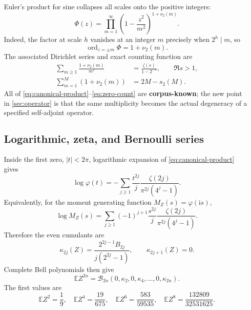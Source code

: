 \documentclass[11pt,oneside]{article}
\theoremstyle{definition}
\newcommand{\ii}{\mathrm i}
\newcommand{\E}{\mathbb E}
\newcommand{\ord}{\operatorname{ord}}
\newcommand{\vtwo}{\nu_2}
\newcommand{\wt}{s_2}
\newcommand{\PhiF}{\Phi}
\newcommand{\phiF}{\varphi}
\newcommand{\Bell}{\mathcal B}
\newcommand{\CorpusKnown}{\textcolor{linkblue}{\textbf{corpus-known}}}
\begin{document}
Euler's product for sine collapses all scales onto the positive integers:
\begin{equation}
 \boxed{\quad
 \PhiF(z)=\prod_{m=1}^{\infty}
 \left(1-\frac{z^2}{m^2}\right)^{1+\vtwo(m)}.
 \quad}
 \label{eq:canonical-product}
\end{equation}
Indeed, the factor at scale \(h\) vanishes at an integer \(m\) precisely when
\(2^h\mid m\), so
\begin{equation}
 \ord_{z=\pm m}\PhiF=1+\vtwo(m).
 \label{eq:zero-multiplicity}
\end{equation}
The associated Dirichlet series and exact counting function are
\begin{align}
 \sum_{m\ge1}\frac{1+\vtwo(m)}{m^s}
 &=\frac{\zeta(s)}{1-2^{-s}},\qquad \Re s>1,
 \label{eq:zero-zeta}\\
 \sum_{m=1}^{M}(1+\vtwo(m))
 &=2M-\wt(M).
 \label{eq:zero-count}
\end{align}
All of \eqref{eq:canonical-product}--\eqref{eq:zero-count} are \CorpusKnown{}; the
new point in \cref{sec:operator} is that the same multiplicity becomes the actual
degeneracy of a specified self-adjoint operator.

\subsection{Logarithmic, zeta, and Bernoulli series}

Inside the first zero, \(|t|<2\pi\), logarithmic expansion of
\eqref{eq:canonical-product} gives
\begin{equation}
 \log\phiF(t)
 =-\sum_{j\ge1}\frac{t^{2j}}{j}
 \frac{\zeta(2j)}{\pi^{2j}(4^j-1)}.
 \label{eq:log-trace-series-preview}
\end{equation}
Equivalently, for the moment generating function \(M_Z(s)=\phiF(\ii s)\),
\begin{equation}
 \log M_Z(s)=\sum_{j\ge1}(-1)^{j+1}\frac{s^{2j}}{j}
 \frac{\zeta(2j)}{\pi^{2j}(4^j-1)}.
 \label{eq:mgf-log-series}
\end{equation}
Therefore the even cumulants are
\begin{equation}
 \kappa_{2j}(Z)
 =\frac{2^{2j-1}B_{2j}}{j(2^{2j}-1)},
 \qquad \kappa_{2j+1}(Z)=0.
 \label{eq:cumulants}
\end{equation}
Complete Bell polynomials then give
\begin{equation}
 \E Z^{2n}=\Bell_{2n}(0,\kappa_2,0,\kappa_4,\ldots,0,\kappa_{2n}).
 \label{eq:bell-moments}
\end{equation}
The first values are
\begin{equation}
 \E Z^2=\frac19,\quad
 \E Z^4=\frac{19}{675},\quad
 \E Z^6=\frac{583}{59535},\quad
 \E Z^8=\frac{132809}{32531625}.
 \label{eq:first-moments}
\end{equation}
\end{document}
